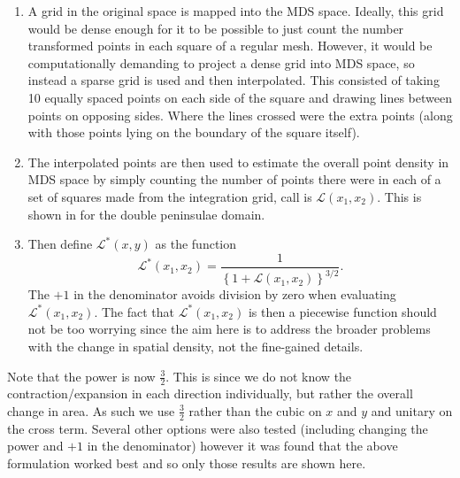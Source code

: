 \begin{enumerate}
\item A grid in the original space is mapped into the MDS space. Ideally, this grid would be dense enough for it to be possible to just count the number transformed points in each square of a regular mesh. However, it would be computationally demanding to project a dense grid into MDS space, so instead a sparse grid is used and then interpolated. This consisted of taking 10 equally spaced points on each side of the square and drawing lines between points on opposing sides. Where the lines crossed were the extra points (along with those points lying on the boundary of the square itself).
\item The interpolated points are then used to estimate the overall point density in MDS space by simply counting the number of points there were in each of a set of squares made from the integration grid, call is $\mathcal{L}(x_1,x_2)$. This is shown in  for the double peninsulae domain. 
\item Then define $\mathcal{L}^*(x,y)$ as the function
\begin{equation*}
\mathcal{L}^*(x_1,x_2)=\frac{1}{ \left \{ 1+\mathcal{L}(x_1,x_2) \right \}^{3/2}}.
\end{equation*}
The $+1$ in the denominator avoids division by zero when evaluating $\mathcal{L}^*(x_1,x_2)$. The fact that $\mathcal{L}^*(x_1,x_2)$ is then a piecewise function should not be too worrying since the aim here is to address the broader problems with the change in spatial density, not the fine-gained details.
\end{enumerate}

Note that the power is now $\frac{3}{2}$. This is since we do not know the contraction/expansion in each direction individually, but rather the overall change in area. As such we use $\frac{3}{2}$ rather than the cubic on $x$ and $y$ and unitary on the cross term. Several other options were also tested (including changing the power and $+1$ in the denominator) however it was found that the above formulation worked best and so only those results are shown here.

